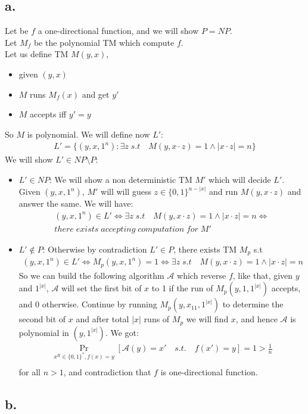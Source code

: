 \documentclass[11pt]{article}
\theoremstyle{plain}
\theoremstyle{nonumberplainnobrackets}
\begin{document}
\subsection*{a. }
Let be $f$ a one-directional function, and we will show $P=NP$.\\
Let $M_f$ be the polynomial TM which compute $f$.\\
Let us define TM $M(y,x)$, 
\begin{itemize}
\item given $(y,x)$
\item $M$ runs $M_f(x)$ and get $y'$
\item $M$ accepts iff $y'=y$
\end{itemize}
So $M$ is polynomial. We will define now $L'$:
\begin{align*}
L' = \{ (y,x,1^n) : \exists z \;s.t\quad M(y,x\cdot z)=1 \wedge |x\cdot z| =n \}
\end{align*}
We will show $L'\in NP\setminus P$:
\begin{itemize}
	\item $L'\in NP$: We will show a non deterministic TM $M'$ which will decide $L'$. Given $(y,x,1^n)$, $M'$ will will guess $z\in \{0,1\}^{n-|x|}$ and run $M(y,x\cdot z)$ and answer the same. We will have:
	\begin{align*}
	(y,x,1^n) \in L' \iff \exists z \;s.t\quad M(y,x\cdot z)=1 \wedge |x\cdot z| =n \iff \\ there \; exists\;accepting\; computation\; for\;M'
	\end{align*}
	\item $L'\notin P$: Otherwise by contradiction $L'\in P$, there exists TM $M_p$ s.t 
	\begin{align*}
	(y,x,1^n) \in L' \iff  M_p(y,x,1^n)=1 \iff  \exists z \;s.t\quad M(y,x\cdot z)=1 \wedge |x\cdot z| =n 
	\end{align*}
	So we can build the following algorithm $\mathcal{A}$ which reverse $f$, like that, given $y$ and $1^{|x|}$, $\mathcal{A}$ will set the first bit of $x$ to 1 if the run of $M_p(y,1,1^{|x|})$ accepts, and 0 otherwise. Continue by running $M_p(y,x_11,1^{|x|})$ to determine the second bit of $x$ and after total $|x|$ runs of $M_p$ we will find $x$, and hence $\mathcal{A}$ is polynomial in $(y,1^{|x|})$. We got:
		\begin{align*}
	\Pr_{x^R\in\{0,1\}^*,f(x)=y} [ \mathcal{A}(y)=x' \quad s.t.\quad f(x')=y]=1 >\frac{1}{n}\\
	\end{align*}
	for all $n>1$, and contradiction that $f$ is one-directional function.
\end{itemize}



\subsection*{b. }
\end{document}
